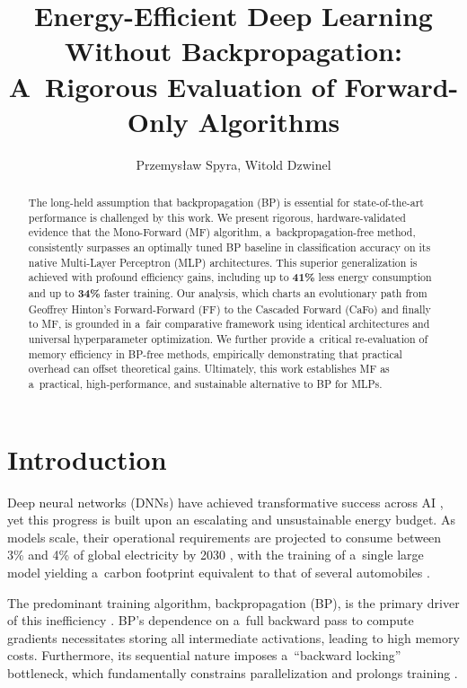 \documentclass[letterpaper]{article}
\title{Energy-Efficient Deep Learning Without Backpropagation: A~Rigorous Evaluation of Forward-Only Algorithms}
\author{
    Przemysław Spyra, Witold Dzwinel
}
\begin{document}
\maketitle

\begin{abstract}
The long-held assumption that backpropagation (BP) is essential for state-of-the-art performance is challenged by this work. We present rigorous, hardware-validated evidence that the Mono-Forward (MF) algorithm, a~backpropagation-free method, consistently surpasses an optimally tuned BP baseline in classification accuracy on its native Multi-Layer Perceptron (MLP) architectures. This superior generalization is achieved with profound efficiency gains, including up to \textbf{41\%} less energy consumption and up to \textbf{34\%} faster training. Our analysis, which charts an evolutionary path from Geoffrey Hinton's Forward-Forward (FF) to the Cascaded Forward (CaFo) and finally to MF, is grounded in a~fair comparative framework using identical architectures and universal hyperparameter optimization. We further provide a~critical re-evaluation of memory efficiency in BP-free methods, empirically demonstrating that practical overhead can offset theoretical gains. Ultimately, this work establishes MF as a~practical, high-performance, and sustainable alternative to BP for MLPs.
\end{abstract}

\section{Introduction}

Deep neural networks (DNNs) have achieved transformative success across AI \cite{krizhevsky2012imagenet, he2016deep, devlin2018bert}, yet this progress is built upon an escalating and unsustainable energy budget. As models scale, their operational requirements are projected to consume between 3\% and 4\% of global electricity by 2030 \cite{wef2025paradox}, with the training of a~single large model yielding a~carbon footprint equivalent to that of several automobiles \cite{abbas2024impact}.

The predominant training algorithm, backpropagation (BP), is the primary driver of this inefficiency \cite{rumelhart1986learning}. BP's dependence on a~full backward pass to compute gradients necessitates storing all intermediate activations, leading to high memory costs. Furthermore, its sequential nature imposes a~``backward locking'' bottleneck, which fundamentally constrains parallelization and prolongs training \cite{jaderberg2017decoupled}.
\end{document}
